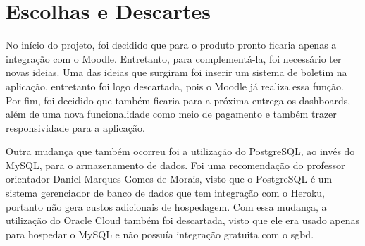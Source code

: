 \section{Escolhas e Descartes}
No início do projeto, foi decidido que para o produto pronto ficaria apenas a integração com o Moodle. Entretanto, para complementá-la, foi necessário ter novas ideias. Uma das ideias que surgiram foi inserir um sistema de boletim na aplicação, entretanto foi logo descartada, pois o Moodle já realiza essa função. Por fim, foi decidido que também ficaria para a próxima entrega os dashboards, além de uma nova funcionalidade como meio de pagamento e também trazer responsividade para a aplicação.  

Outra mudança que também ocorreu foi a utilização do PostgreSQL, ao invés do MySQL, para o armazenamento de dados. Foi uma recomendação do professor orientador Daniel Marques Gomes de Morais, visto que o PostgreSQL é um sistema gerenciador de banco de dados que tem integração com o Heroku, portanto não gera custos adicionais de hospedagem. Com essa mudança, a utilização do Oracle Cloud também foi descartada, visto que ele era usado apenas para hospedar o MySQL e não possuía integração gratuita com o \ac{sgbd}.
